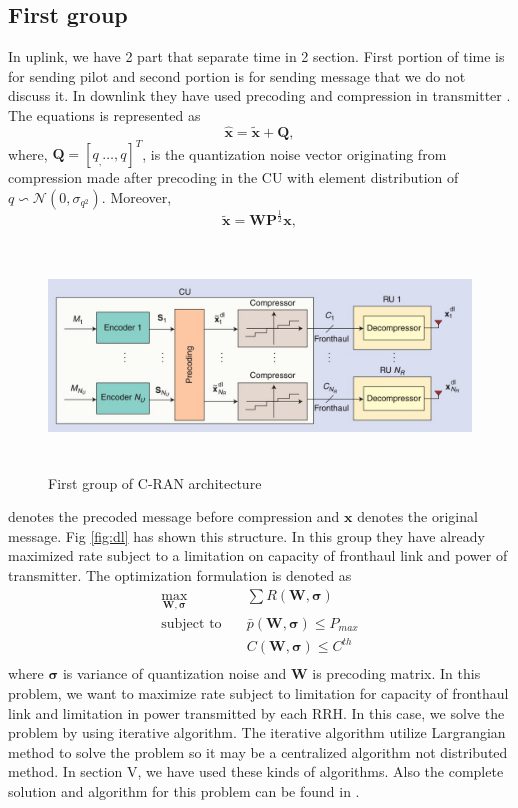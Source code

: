 \documentclass[journal,onecolumn,11pt,draftcls,doublespace]{IEEEtran}
\begin{document}
\subsection{First group}
In uplink, we have 2 part that separate time in 2 section. First portion of time is for sending pilot and second portion is for sending message that we do not discuss it. 
In downlink they have used precoding and compression in transmitter \cite{22,1111,44,66}. 
The equations is represented as 
\begin{equation}
\label{eq_pow1}
 \hat{\boldsymbol{x}} = \tilde{\boldsymbol{x}} + \boldsymbol{Q},
\end{equation}
where, $\boldsymbol{Q} = \left[ q_,\ldots,q\right]^T$,  is the quantization noise vector originating from compression made after precoding in the CU with element distribution of
$q\backsim \mathcal{N}(0,\sigma_{q^2}) $. Moreover,
$$\tilde{\boldsymbol{x}} = \textbf{W}\textbf{P}^{\frac{1}{2}} \boldsymbol{x},$$
\begin{figure}[H]
  \centering
    \includegraphics[width=\linewidth, height=6cm]{dl}
  \caption{First group of C-RAN architecture \cite{1111}}
  \label{fig:dl}
\end{figure}
denotes the precoded message before compression and $\boldsymbol{x}$ denotes the original message.
Fig \eqref{fig:dl} has shown this structure. In this group they have already maximized rate subject to a limitation on capacity of fronthaul link and power of transmitter.
The optimization formulation is denoted as 
\begin{equation}
\begin{aligned}
\max\limits_{\boldsymbol{W},\boldsymbol{\sigma}}   \quad &   \sum R(\boldsymbol{W},\boldsymbol{\sigma})\\
\text{subject to} \quad  & \bar{p}(\boldsymbol{W}, \boldsymbol{\sigma}) \leq P_{max}   \\
&C(\boldsymbol{W},\boldsymbol{\sigma})\leq C^{th}  \\
\end{aligned}
\end{equation}
where $\boldsymbol{\sigma}$ is variance of quantization noise and $\boldsymbol{W}$ is precoding matrix. In this problem, we want to maximize rate subject to limitation for capacity of fronthaul link and limitation in power transmitted by each RRH. In this case, we solve the problem by using iterative algorithm. The iterative algorithm utilize Largrangian method to solve the problem so
it may be a centralized algorithm not distributed method. In section V, we have used these kinds of algorithms. Also the complete solution and algorithm for this problem can be found in \cite{22}.
\end{document}
